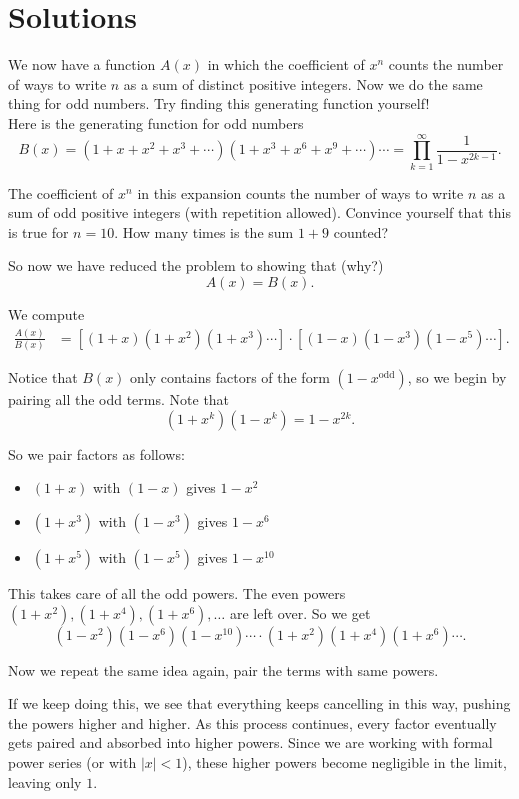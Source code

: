 \documentclass[11pt]{scrartcl}
\theoremstyle{plain}
\theoremstyle{definition}
\theoremstyle{remark}
\newcounter{problem}
\begin{document}
\section{Solutions}

We now have a function $A(x)$ in which the coefficient of $x^n$ counts the number of ways to write $n$ as a sum of distinct positive integers. Now we do the same thing for odd numbers. Try finding this generating function yourself!\\

\noindent Here is the generating function for odd numbers
\[
B(x) = (1 + x + x^{2} + x^{3} + \cdots)(1 + x^3 + x^{6} + x^{9} + \cdots)\cdots = \prod_{k=1}^{\infty} \frac{1}{1-x^{2k-1}}.
\]

\noindent The coefficient of $x^n$ in this expansion counts the number of ways to write $n$ as a sum of odd positive integers (with repetition allowed). Convince yourself that this is true for $n = 10$. How many times is the sum $1+9$ counted?

\bigskip

\noindent So now we have reduced the problem to showing that (why?)
\[
A(x) = B(x).
\]

\noindent We compute
\begin{align*}
\frac{A(x)}{B(x)} &= [(1+x)(1+x^2)(1+x^3)\cdots]\cdot[(1-x)(1-x^3)(1-x^5)\cdots].
\end{align*}

\noindent Notice that $B(x)$ only contains factors of the form $(1 - x^{\text{odd}})$, so we begin by pairing all the odd terms. Note that
\[
(1+x^k)(1-x^k) = 1 - x^{2k}.
\]

\noindent So we pair factors as follows:
\begin{itemize}
    \item $(1+x)$ with $(1-x)$ gives $1-x^2$
    \item $(1+x^3)$ with $(1-x^3)$ gives $1-x^6$
    \item $(1+x^5)$ with $(1-x^5)$ gives $1-x^{10}$
\end{itemize}

\noindent This takes care of all the odd powers. The even powers $(1+x^2),(1+x^4),(1+x^6),\dots$ are left over. So we get
\[
(1-x^2)(1-x^6)(1-x^{10})\cdots \cdot (1+x^2)(1+x^4)(1+x^6)\cdots.
\]

\noindent Now we repeat the same idea again, pair the terms with same powers.

\bigskip

\noindent If we keep doing this, we see that everything keeps cancelling in this way, pushing the powers higher and higher. As this process continues, every factor eventually gets paired and absorbed into higher powers. Since we are working with formal power series (or with $|x|<1$), these higher powers become negligible in the limit, leaving only $1$.
\end{document}
